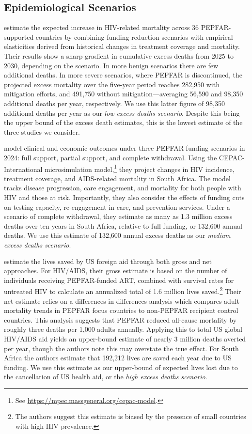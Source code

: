 \documentclass[letterpaper,12pt]{article}
\theoremstyle{definition}
\begin{document}
\begin{spacing}{1.5}
\subsection{Epidemiological Scenarios}

\citet{Brink2025} estimate the expected increase in HIV-related mortality across 36 PEPFAR-supported countries by combining funding reduction scenarios with empirical elasticities derived from historical changes in treatment coverage and mortality. Their results show a sharp gradient in cumulative excess deaths from 2025 to 2030, depending on the scenario. In more benign scenarios there are few additional deaths. In more severe scenarios, where PEPFAR is discontinued, the projected excess mortality over the five-year period reaches 282,950 with mitigation efforts, and 491,750 without mitigation—averaging 56,590 and 98,350 additional deaths per year, respectively. We use this latter figure of 98,350 additional deaths per year as our \textit{low excess deaths scenario}. Despite this being the upper bound of the \citet{Brink2025} excess death estimates, this is the lowest estimate of the three studies we consider.

\citet{Gandhi2025} model clinical and economic outcomes under three PEPFAR funding scenarios in 2024: full support, partial support, and complete withdrawal. Using the CEPAC-International microsimulation model,\footnote{See \href{https://mpec.massgeneral.org/cepac-model}{https://mpec.massgeneral.org/cepac-model}.} they project changes in HIV incidence, treatment coverage, and AIDS-related mortality in South Africa. The model tracks disease progression, care engagement, and mortality for both people with HIV and those at risk. Importantly, they also consider the effects of funding cuts on testing capacity, re-engagement in care, and prevention services. Under a scenario of complete withdrawal, they estimate as many as 1.3 million excess deaths over ten years in South Africa, relative to full funding, or 132,600 annual deaths. We use this estimate of 132,600 annual excess deaths as our \textit{medium excess deaths scenario}.

\citet{KS2025} estimate the lives saved by US foreign aid through both gross and net approaches. For HIV/AIDS, their gross estimate is based on the number of individuals receiving PEPFAR-funded ART, combined with survival rates for untreated HIV to calculate an annualized total of 1.6 million lives saved.\footnote{The authors suggest this estimate is biased by the presence of small countries with high HIV prevalence.} Their net estimate relies on a differences-in-differences analysis which compares adult mortality trends in PEPFAR focus countries to non-PEPFAR recipient control countries. This analysis suggests that PEPFAR reduced all-cause mortality by roughly three deaths per 1,000 adults annually. Applying this to total US global HIV/AIDS aid yields an upper-bound estimate of nearly 3 million deaths averted per year, though the authors note this may overstate the true effect. For South Africa the authors estimate that 192,212 lives are saved each year due to US funding. We use this estimate as our upper-bound of expected lives lost due to the cancellation of US health aid, or the \textit{high excess deaths scenario}.


\end{spacing}
\end{document}
